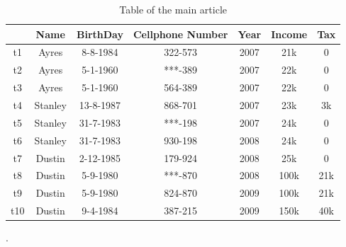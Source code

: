 \documentclass[letterpaper, 12pt]{report}
\begin{document}
\begin{table}[H]
	\centering
	\begin{tabular}{|c|c c c c c c|}
	\hline
	    & Name & BirthDay & Cellphone Number & Year & Income & Tax\\
	\hline
	 t1 & Ayres & 8-8-1984 & 322-573 & 2007 & 21k & 0\\
	 t2 & Ayres & 5-1-1960 & ***-389 & 2007 & 22k & 0 \\
	 t3 & Ayres & 5-1-1960 & 564-389 & 2007 & 22k & 0 \\
	 t4 & Stanley & 13-8-1987 & 868-701 & 2007 & 23k & 3k\\
	 t5 & Stanley & 31-7-1983 & ***-198 & 2007 & 24k & 0\\
	 t6 & Stanley & 31-7-1983 & 930-198 & 2008 & 24k & 0\\
	 t7 & Dustin & 2-12-1985 & 179-924 & 2008 & 25k & 0 \\
	 t8 & Dustin & 5-9-1980 & ***-870 & 2008 & 100k & 21k \\
	 t9 & Dustin & 5-9-1980 & 824-870 & 2009 & 100k & 21k \\
	 t10 & Dustin & 9-4-1984 & 387-215 & 2009 & 150k & 40k \\
	 \hline
	\end{tabular}
	\caption{\label{tableMain} Table of the main article\cite{main}}.
\end{table}
\end{document}
